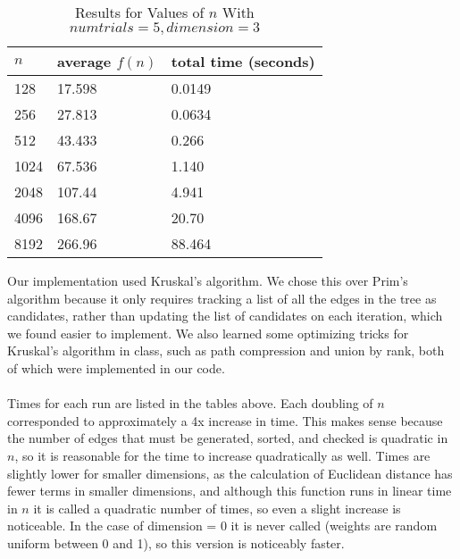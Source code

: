 \documentclass[11pt]{article}
\begin{document}
	\begin{table}[h]
		\centering
		\caption{Results for Values of $n$ With $numtrials = 5, dimension = 3$}
		\begin{tabular}{lll}
			$n$                         & average $f(n)$                        & total time (seconds)                        \\ \hline
			\multicolumn{1}{|l|}{128} & \multicolumn{1}{l|}{17.598} & \multicolumn{1}{l|}{0.0149} \\ \hline
			\multicolumn{1}{|l|}{256}    & \multicolumn{1}{l|}{27.813}       & \multicolumn{1}{l|}{0.0634}       \\ \hline
			\multicolumn{1}{|l|}{512}    & \multicolumn{1}{l|}{43.433}       & \multicolumn{1}{l|}{0.266}       \\ \hline
			\multicolumn{1}{|l|}{1024}    & \multicolumn{1}{l|}{67.536}       & \multicolumn{1}{l|}{1.140}       \\ \hline
			\multicolumn{1}{|l|}{2048}    & \multicolumn{1}{l|}{107.44}       & \multicolumn{1}{l|}{4.941}       \\ \hline
			\multicolumn{1}{|l|}{4096}    & \multicolumn{1}{l|}{168.67}       & \multicolumn{1}{l|}{20.70}       \\ \hline
			\multicolumn{1}{|l|}{8192}    & \multicolumn{1}{l|}{266.96}       & \multicolumn{1}{l|}{88.464}       \\ \hline
		\end{tabular}
	\end{table}
\newpage	
\noindent Our implementation used Kruskal's algorithm. We chose this over Prim's algorithm because it only requires tracking a list of all the edges in the tree as candidates, rather than updating the list of candidates on each iteration, which we found easier to implement. We also learned some optimizing tricks for Kruskal's algorithm in class, such as path compression and union by rank, both of which were implemented in our code.\\
\\
Times for each run are listed in the tables above. Each doubling of $n$ corresponded to approximately a 4x increase in time. This makes sense because the number of edges that must be generated, sorted, and checked is quadratic in $n$, so it is reasonable for the time to increase quadratically as well. Times are slightly lower for smaller dimensions, as the calculation of Euclidean distance has fewer terms in smaller dimensions, and although this function runs in linear time in $n$ it is called a quadratic number of times, so even a slight increase is noticeable. In the case of dimension = 0 it is never called (weights are random uniform between 0 and 1), so this version is noticeably faster.\\
\end{document}

